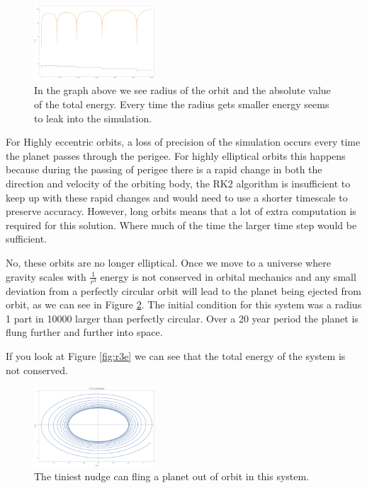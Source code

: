 \documentclass{article}
\begin{document}
\begin{figure}[h]
	\begin{center}
		\includegraphics[width=0.4\textwidth]{ver.pdf}
	\end{center}
	\caption{In the graph above we see radius of the orbit and the absolute value of the total energy. Every time the radius gets smaller energy seems to leak into the simulation.}
	\label{fig:veo}
\end{figure}

For Highly eccentric orbits, a loss of precision of the simulation occurs every time the planet passes through the perigee. For highly elliptical orbits this happens because during the passing of perigee there is a rapid change in both the direction and velocity of the orbiting body, the RK2 algorithm is insufficient to keep up with these rapid changes and would need to use a shorter timescale to preserve accuracy. However, long orbits means that a lot of extra computation is required for this solution. Where much of the time the larger time step would be sufficient.

\pagebreak
\bigskip
{}
\medskip

No, these orbits are no longer elliptical. Once we move to a universe where gravity scales with $\frac{1}{r^3}$ energy is not conserved in orbital mechanics and any small deviation from a perfectly circular orbit will lead to the planet being ejected from orbit, as we can see in Figure \ref{fig:r3}. The initial condition for this system was a radius 1 part in 10000 larger than perfectly circular. Over a 20 year period the planet is flung further and further into space.

If you look at Figure \ref{fig:r3e} we can see that the total energy of the system is not conserved.

\begin{figure}[h]
	\begin{center}
		\includegraphics[width=0.4\textwidth]{r3.pdf}
	\end{center}
	\caption{The tiniest nudge can fling a planet out of orbit in this system.}
	\label{fig:r3}
\end{figure}
\end{document}
